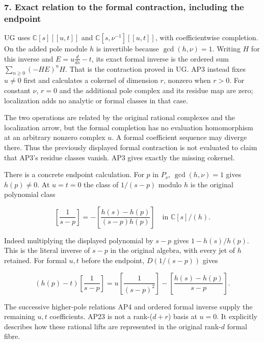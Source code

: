 \documentclass{article}
\begin{document}
\subsubsection{7. Exact relation to the formal contraction, including the endpoint}\label{endpoint-analytic_pole--exact-relation-to-the-formal-contraction-including-the-endpoint}

UG uses \(\mathbb C[s][[u,t]]\) and \(\mathbb C[s,\nu^{-1}][[u,t]]\), with coefficientwise completion. On the added pole module \(h\) is invertible because \(\gcd(h,\nu)=1\). Writing \(H\) for this inverse and \(E=u\frac{d}{ds}-t\), its exact formal inverse is the ordered sum \(\sum_{n\ge0}(-HE)^n H\). That is the contraction proved in UG. AP3 instead fixes \(u\ne0\) first and calculates a cokernel of dimension \(r\), nonzero when \(r>0\). For constant \(\nu\), \(r=0\) and the additional pole complex and its residue map are zero; localization adds no analytic or formal classes in that case.

The two operations are related by the original rational complexes and the localization arrow, but the formal completion has no evaluation homomorphism at an arbitrary nonzero complex \(u\). A formal coefficient sequence may diverge there. Thus the previously displayed formal contraction is not evaluated to claim that AP3's residue classes vanish. AP3 gives exactly the missing cokernel.

There is a concrete endpoint calculation. For \(p\) in \(P_\nu\), \(\gcd(h,\nu)=1\) gives \(h(p)\ne0\). At \(u=t=0\) the class of \(1/(s-p)\) modulo \(h\) is the original polynomial class

\[
\left[\frac{1}{s-p}\right]
=-\left[\frac{h(s)-h(p)}{(s-p)h(p)}\right]
\quad\text{in }\mathbb C[s]/(h).
\tag{AP23}
\]

Indeed multiplying the displayed polynomial by \(s-p\) gives \(1-h(s)/h(p)\). This is the literal inverse of \(s-p\) in the original algebra, with every jet of \(h\) retained. For formal \(u,t\) before the endpoint, \(D(1/(s-p))\) gives

\[
(h(p)-t)\left[\frac{1}{s-p}\right]
=u\left[\frac{1}{(s-p)^2}\right]
-\left[\frac{h(s)-h(p)}{s-p}\right].
\tag{AP24}
\]

The successive higher-pole relations AP4 and ordered formal inverse supply the remaining \(u,t\) coefficients. AP23 is not a rank-(\(d+r\)) basis at \(u=0\). It explicitly describes how these rational lifts are represented in the original rank-\(d\) formal fibre.
\end{document}

